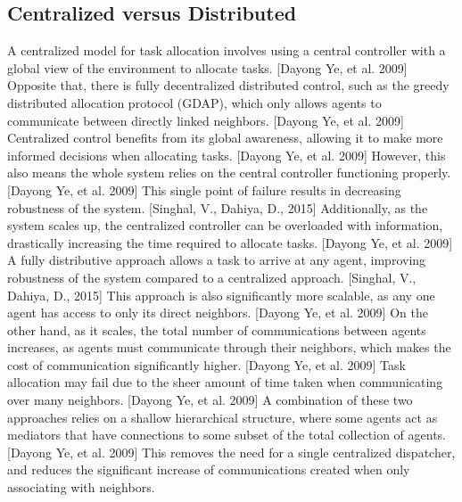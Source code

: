 \documentclass[12pt,letterpaper,onecolumn]{article}
\begin{document}
	\subsection{Centralized versus Distributed}
	A centralized model for task allocation involves using a central controller with a global view of the environment to allocate tasks. [Dayong Ye, et al. 2009] Opposite that, there is fully decentralized distributed control, such as the greedy distributed allocation protocol (GDAP), which only allows agents to communicate between directly linked neighbors. [Dayong Ye, et al. 2009] Centralized control benefits from its global awareness, allowing it to make more informed decisions when allocating tasks. [Dayong Ye, et al. 2009] However, this also means the whole system relies on the central controller functioning properly. [Dayong Ye, et al. 2009] This single point of failure results in decreasing robustness of the system. [Singhal, V., Dahiya, D., 2015] Additionally, as the system scales up, the centralized controller can be overloaded with information, drastically increasing the time required to allocate tasks. [Dayong Ye, et al. 2009] A fully distributive approach allows a task to arrive at any agent, improving robustness of the system compared to a centralized approach. [Singhal, V., Dahiya, D., 2015] This approach is also significantly more scalable, as any one agent has access to only its direct neighbors. [Dayong Ye, et al. 2009] On the other hand, as it scales, the total number of communications between agents increases, as agents must communicate through their neighbors, which makes the cost of communication significantly higher. [Dayong Ye, et al. 2009] Task allocation may fail due to the sheer amount of time taken when communicating over many neighbors. [Dayong Ye, et al. 2009] A combination of these two approaches relies on a shallow hierarchical structure, where some agents act as mediators that have connections to some subset of the total collection of agents. [Dayong Ye, et al. 2009] This removes the need for a single centralized dispatcher, and reduces the significant increase of communications created when only associating with neighbors. 
\end{document}

